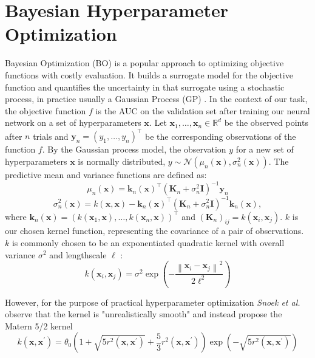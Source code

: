 \documentclass[bsc,frontabs,twoside,singlespacing,parskip,deptreport]{infthesis}     %
\begin{document}
\chapter{Bayesian Hyperparameter Optimization}
Bayesian Optimization (BO) is a popular approach to optimizing objective functions with costly evaluation. It builds a surrogate model for the objective function and quantifies the uncertainty in that surrogate using a stochastic process, in practice usually a Gaussian Process (GP) \cite{frazier_tutorial_2018}.
In the context of our task, the objective function \(f\) is the AUC on the validation set after training our neural network on a set of hyperparameters \(\mathbf{x}\). 
Let \(\mathbf{x}_{1}, \ldots, \mathbf{x}_{n} \in \mathbb{R}^{d}\) be the observed points after \(n\) trials and \(\mathbf{y}_{n}=\left(y_{1}, \ldots, y_{n}\right)^{\top}\) be the corresponding observations of the function \(f\).
By the Gaussian process model, the observation \(y\) for a new set of hyperparameters \(\mathbf{x}\) is normally distributed, \(y \sim \mathcal{N}\left(\mu_n(\mathbf{x}), \sigma_n^{2}(\mathbf{x})\right)\). The predictive mean and  variance functions are defined as:
\[\mu_{n}(\mathbf{x})=\mathbf{k}_{n}(\mathbf{x})^{\top}\left(\mathbf{K}_{n}+\sigma_{n}^{2} \mathbf{I}\right)^{-1} \mathbf{y}_{n}\]
\[\sigma_{n}^{2}(\mathbf{x})=k(\mathbf{x}, \mathbf{x})-\mathbf{k}_{n}(\mathbf{x})^{\top}\left(\mathbf{K}_{n}+\sigma_{n}^{2} \mathbf{I}\right)^{-1} \mathbf{k}_{n}(\mathbf{x}),\]
where
\(\mathbf{k}_{n}(\mathbf{x})=\left(k\left(\mathbf{x}_{1}, \mathbf{x}\right), \ldots, k\left(\mathbf{x}_{n}, \mathbf{x}\right)\right)^{\top}\)
and \(\left(\mathbf{K}_{n}\right)_{i j}=k\left(\mathbf{x}_{i}, \mathbf{x}_{j}\right)\). \(k\) is our chosen kernel function, representing the covariance of a pair of observations. \(k\) is commonly chosen to be an exponentiated quadratic kernel with overall variance \(\sigma^{2}\) and lengthscale \(\ell\) :
\[k\left(\mathbf{x}_{i}, \mathbf{x}_{j}\right)=\sigma^{2} \exp \left(-\frac{\left\|\mathbf{x}_{i}-\mathbf{x}_{j}\right\|^{2}}{2 \ell^{2}}\right)\]

However, for the purpose of practical hyperparameter optimization \textit{Snoek et al.} \cite{snoek_practical_nodate} observe that the kernel is "unrealistically smooth" and instead propose the Matern 5/2 kernel 
\[k\left(\mathbf{x}, \mathbf{x}^{\prime}\right)=\theta_{0}\left(1+\sqrt{5 r^{2}\left(\mathbf{x}, \mathbf{x}^{\prime}\right)}+\frac{5}{3} r^{2}\left(\mathbf{x}, \mathbf{x}^{\prime}\right)\right) \exp \left(-\sqrt{5 r^{2}\left(\mathbf{x}, \mathbf{x}^{\prime}\right)}\right)\]
\end{document}
